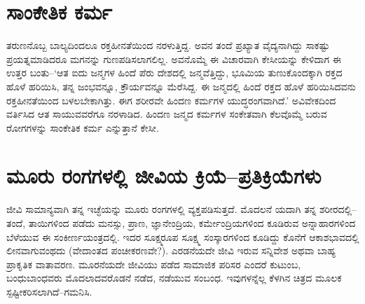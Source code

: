 \section*{ಸಾಂಕೇತಿಕ ಕರ್ಮ}


ತರುಣನೊಬ್ಬ ಬಾಲ್ಯದಿಂದಲೂ ರಕ್ತಹೀನತೆಯಿಂದ ನರಳುತ್ತಿದ್ದ. ಅವನ ತಂದೆ ಪ್ರಖ್ಯಾತ ವೈದ್ಯನಾಗಿದ್ದು ಸಾಕಷ್ಟು ಪ್ರಯತ್ನಮಾಡಿದರೂ ಮಗನನ್ನು ಗುಣಪಡಿಸಲಾಗಲಿಲ್ಲ. ಅವನೊಮ್ಮೆ ಈ ವಿಚಾರವಾಗಿ ಕೇಸೀಯನ್ನು ಕೇಳಿದಾಗ ಈ ಉತ್ತರ ಬಂತು–‘ಆತ ಐದು ಜನ್ಮಗಳ ಹಿಂದೆ ಪೆರು ದೇಶದಲ್ಲಿ ಜನ್ಮವೆತ್ತಿದ್ದು, ಭೂಮಿಯ ತುಣುಕೊಂದಕ್ಕಾಗಿ ರಕ್ತದ ಹೊಳೆ ಹರಿಯಿಸಿ, ತನ್ನ ಜಂಭವನ್ನೂ, ಕ್ರೌರ್ಯವನ್ನೂ ಮೆರೆಸಿದ್ದ. ಈ ಜನ್ಮದಲ್ಲಿ ಹಿಂದೆ ರಕ್ತದ ಹೊಳೆ ಹರಿಯಿಸಿದವನು ರಕ್ತಹೀನತೆಯಿಂದ ಬಳಲಬೇಕಾಗಿತ್ತು. ಈಗ ಶರೀರವೇ ಹಿಂದಣ ಕರ್ಮಗಳ ಯುದ್ಧರಂಗವಾಗಿದೆ.’ ಅವಿವೇಕದಿಂದ ವರ್ತಿಸಿದ ಆತ ಸಾಯುವವರೆಗೂ ನರಳಾಡಿದ. ಹಿಂದಣ ಜನ್ಮದ ಕರ್ಮಗಳ ಸಂಕೇತವಾಗಿ ಕೆಲವೊಮ್ಮೆ ಬರುವ ರೋಗಗಳನ್ನು ಸಾಂಕೇತಿಕ ಕರ್ಮ  ಎನ್ನುತ್ತಾನೆ ಕೇಸೀ.


\section*{ಮೂರು ರಂಗಗಳಲ್ಲಿ ಜೀವಿಯ ಕ್ರಿಯೆ–ಪ್ರತಿಕ್ರಿಯೆಗಳು}


ಜೀವಿ ಸಾಮಾನ್ಯವಾಗಿ ತನ್ನ ಇಚ್ಛೆಯನ್ನು ಮೂರು ರಂಗಗಳಲ್ಲಿ ವ್ಯಕ್ತಪಡಿಸುತ್ತದೆ. ಮೊದಲನೆ ಯದಾಗಿ ತನ್ನ ಶರೀರದಲ್ಲಿ–ತಂದೆ, ತಾಯಿಗಳಿಂದ ಪಡೆದು ಮನಸ್ಸು, ಪ್ರಾಣ, ಜ್ಞಾನೇಂದ್ರಿಯ, ಕರ್ಮೇಂದ್ರಿಯಗಳಿಂದ ಕೂಡಿರುವ ಅನ್ನಾಹಾರಗಳಿಂದ ಬೆಳೆಯುವ ಈ ಸಂಕೀರ್ಣಯಂತ್ರದಲ್ಲಿ. ಇದರ ಸೂಕ್ಷ್ಮರೂಪ ಸೂಕ್ಷ್ಮ ಸಂಸ್ಕಾರಗಳಿಂದ ಕೂಡಿದ್ದು ಕೊನೆಗೆ ಆಕಾಶಭಾವದಲ್ಲಿ ಲೀನವಾಗು\-ವಂಥದು (ವೇದಾಂತದ ಪಂಚೀಕರಣವೇ?). ಎರಡನೆಯದೇ ಜೀವಿ ಇರುವ ಸನ್ನಿವೇಶ ಅಥವಾ ಬಾಹ್ಯ ಪ್ರಾಕೃತಿಕ ವಾತಾವರಣ. ಮೂರನೆಯದೇ ಜೀವಿಯು ಪಡೆದ ಸಾಮಾಜಿಕ ಪರಿಸರ ಎಂದರೆ ಕುಟುಂಬ, ಬಂಧುಬಾಂಧವರು ಮೊದಲಾದವರೊಡನೆ ನಡೆದ, ನಡೆಯುವ ಸಂಬಂಧ. ಇವುಗಳನ್ನೆಲ್ಲ ಕೆಳಗಿನ ಚಿತ್ರದ ಮೂಲಕ ಸ್ಪಷ್ಟೀಕರಿಸಲಾಗಿದೆ–ಗಮನಿಸಿ.


